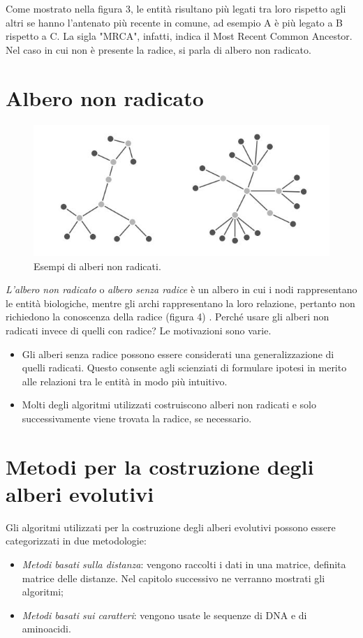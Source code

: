 \newline
Come mostrato nella figura 3, le entità risultano più legati tra loro rispetto agli altri se hanno l'antenato più recente in comune, ad esempio A è più legato a B rispetto a C. La sigla "MRCA", infatti, indica il Most Recent Common Ancestor.
\newline
Nel caso in cui non è presente la radice, si parla di albero non radicato.
\newpage

\section{Albero non radicato}
\begin{figure}[h!]
	\includegraphics[width=\linewidth]{unrooted_trees.jpg}
 	\caption{Esempi di alberi non radicati.}
  	\label{fig:RootedTree}
\end{figure}
\textit{L'albero non radicato} o \textit{albero senza radice} è un albero in cui i nodi rappresentano le entità biologiche, mentre gli archi rappresentano la loro relazione, pertanto non richiedono la conoscenza della radice (figura 4) \cite{bioinfalganactivelearningapproachparttwo}.
\newline
Perché usare gli alberi non radicati invece di quelli con radice? Le motivazioni sono varie.
\begin{itemize}
	\item Gli alberi senza radice possono essere considerati una generalizzazione di quelli radicati. Questo consente agli scienziati di formulare ipotesi in merito alle relazioni tra le entità in modo più intuitivo.
	\item Molti degli algoritmi utilizzati costruiscono alberi non radicati e solo successivamente viene trovata la radice, se necessario.
\end{itemize}


\section{Metodi per la costruzione degli alberi evolutivi}
Gli algoritmi utilizzati per la costruzione degli alberi evolutivi possono essere categorizzati in due metodologie:
\begin{itemize}
	\item \textit{Metodi basati sulla distanza}: vengono raccolti i dati in una matrice, definita matrice delle distanze. Nel capitolo successivo ne verranno mostrati gli algoritmi;
	\item \textit{Metodi basati sui caratteri}: vengono usate le sequenze di DNA e di aminoacidi.
\end{itemize}